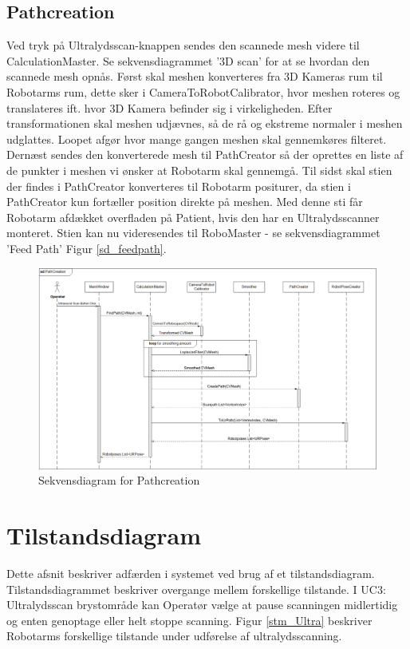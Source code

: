 \subsection{Pathcreation}
Ved tryk på Ultralydsscan-knappen sendes den scannede mesh videre til CalculationMaster. Se sekvensdiagrammet '3D scan' for at se hvordan den scannede mesh opnås.
Først skal meshen konverteres fra 3D Kameras rum til Robotarms rum, dette sker i CameraToRobotCalibrator, hvor meshen roteres og translateres ift. hvor 3D Kamera befinder sig i virkeligheden.
Efter transformationen skal meshen udjævnes, så de rå og ekstreme normaler i meshen udglattes. Loopet afgør hvor mange gangen meshen skal gennemkøres filteret. Dernæst sendes den konverterede mesh til PathCreator så der oprettes en liste af de punkter i meshen vi ønsker at Robotarm skal gennemgå.
Til sidst skal stien der findes i PathCreator konverteres til Robotarm positurer, da stien i PathCreator kun fortæller position direkte på meshen. Med denne sti får Robotarm afdækket overfladen på Patient, hvis den har en Ultralydsscanner monteret.
Stien kan nu videresendes til RoboMaster - se sekvensdiagrammet 'Feed Path' Figur \ref{sd_feedpath}.

\begin{figure}[H]
    \centering
    \includegraphics[width=1.4\textwidth, angle =90]{figurer/d/Design/Sequence/sd_pathcreation}
    \caption{Sekvensdiagram for Pathcreation}
    \label{sd_pathcreation}
\end{figure}
\newpage

\section{Tilstandsdiagram}
Dette afsnit beskriver adfærden i systemet ved brug af et tilstandsdiagram. Tilstandsdiagrammet beskriver overgange mellem forskellige tilstande. I UC3: Ultralydsscan brystområde kan Operatør vælge at pause scanningen midlertidig og enten genoptage eller helt stoppe scanning. Figur \ref{stm_Ultra} beskriver Robotarms forskellige tilstande under udførelse af ultralydsscanning. 

